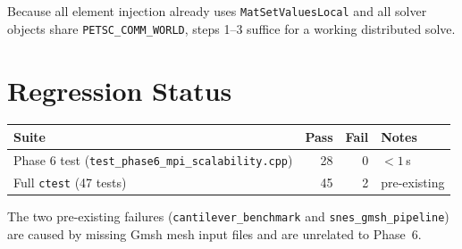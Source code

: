 Because all element injection already uses \texttt{MatSetValuesLocal}
and all solver objects share \texttt{PETSC\_COMM\_WORLD}, steps 1--3
suffice for a working distributed solve.


\section{Regression Status}
\label{sec:phase6-regression}

\begin{center}
\begin{tabular}{@{}lrrl@{}}
\toprule
Suite & Pass & Fail & Notes \\
\midrule
Phase 6 test (\texttt{test\_phase6\_mpi\_scalability.cpp}) & 28 & 0 & $<1$\,s \\
Full \texttt{ctest} (47 tests)                             & 45 & 2 & pre-existing \\
\bottomrule
\end{tabular}
\end{center}

The two pre-existing failures (\texttt{cantilever\_benchmark} and
\texttt{snes\_gmsh\_pipeline}) are caused by missing Gmsh mesh input
files and are unrelated to Phase~6.
